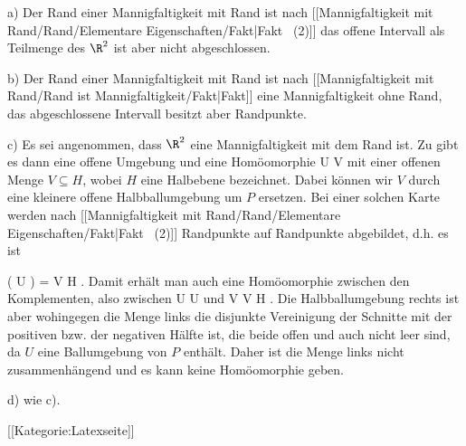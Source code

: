 a) Der Rand
 einer Mannigfaltigkeit mit Rand ist nach
[[Mannigfaltigkeit mit Rand/Rand/Elementare Eigenschaften/Fakt|Fakt   (2)]]
das offene Intervall als Teilmenge des $\R^2$ ist aber nicht abgeschlossen.

b) Der Rand
 einer Mannigfaltigkeit mit Rand ist nach
[[Mannigfaltigkeit mit Rand/Rand ist Mannigfaltigkeit/Fakt|Fakt]]
eine Mannigfaltigkeit ohne Rand, das abgeschlossene Intervall besitzt aber Randpunkte.

c) Es sei angenommen, dass $\R^2$ eine Mannigfaltigkeit mit dem Rand
 ist. Zu
 gibt es dann eine offene Umgebung
 und eine Homöomorphie
\maabbdisp {\alpha} { U } {V
} {}
mit einer offenen Menge $V \subseteq H$, wobei $H$ eine Halbebene bezeichnet. Dabei können wir $V$ durch eine kleinere offene Halbballumgebung um $P$ ersetzen. Bei einer solchen Karte werden nach
[[Mannigfaltigkeit mit Rand/Rand/Elementare Eigenschaften/Fakt|Fakt   (2)]]
Randpunkte auf Randpunkte abgebildet, d.h. es ist

\mavergleichskettedisp
{\vergleichskette
{\alpha ( U \cap \R  )
}
{ =} { V \cap \delta H
}
{ } {
}
{ } {
}
{ } {
}
}
{}{}{.}
Damit erhält man auch eine Homöomorphie zwischen den Komplementen, also zwischen
\mathkor {} {U \setminus U \cap \R} {und} {V \setminus V \cap \delta H} {.}
Die Halbballumgebung rechts ist aber
wohingegen die Menge links die disjunkte Vereinigung der Schnitte mit der positiven bzw. der negativen Hälfte ist, die beide offen und auch nicht leer sind, da $U$ eine Ballumgebung von $P$ enthält. Daher ist die Menge links nicht zusammenhängend und es kann keine Homöomorphie geben.

d) wie c).

 [[Kategorie:Latexseite]]
